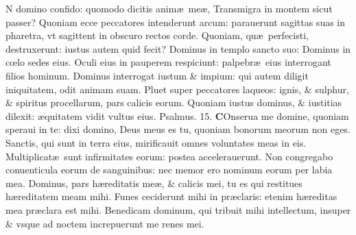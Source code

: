 \documentclass[a5paper,10pt]{book}
\def\ae{æ}
\def\oe{œ}
\begin{document}
\begin{multicols*}{2}
N domino confido: quomodo dicitis anim\ae \ me\ae ,
\newline \color{red} T\color{black}ransmigra in montem sicut passer?
\newline \color{red} Q\color{black}uoniam ecce peccatores intenderunt arcum: parauerunt sagittas suas in pharetra, vt sagittent in obscuro rectos corde.
\newline \color{red} Q\color{black}uoniam, qu\ae \ perfecisti, destruxerunt: iustus autem quid fecit?
\newline \color{red} D\color{black}ominus in templo sancto suo: Dominus in c\oe lo sedes eius.
\newline \color{red} O\color{black}culi eius in pauperem respiciunt: palpebr\ae \ eius interrogant filios hominum.
\newline \color{red} D\color{black}ominus interrogat iustum \& impium: qui autem diligit iniquitatem, odit animam suam.
\newline \color{red} P\color{black}luet super peccatores laqueos: ignis, \& sulphur, \& spiritus procellarum, pars calicis eorum.
\newline \color{red} Q\color{black}uoniam iustus dominus, \& iustitias dilexit: \ae quitatem vidit vultus eius.
\newline \color{red} Psalmus. \hypertarget{ps15}{15.} \color{black}
\lettrine[lines=2]{\bfseries \color{red} C}{}Onserua me domine, quoniam speraui in te: dixi domino, Deus meus es tu, quoniam bonorum meorum non eges.
\newline \color{red} S\color{black}anctis, qui sunt in terra eius, mirificauit omnes voluntates meas in eis.
\newline \color{red} M\color{black}ultiplicat\ae \ sunt infirmitates eorum: postea accelerauerunt.
\newline \color{red} N\color{black}on congregabo conuenticula eorum de sanguinibus: nec memor ero nominum eorum per labia mea.
\newline \color{red} D\color{black}ominus, pars h\ae reditatis me\ae , \& calicis mei, tu es qui restitues h\ae reditatem meam mihi.
\newline \color{red} F\color{black}unes ceciderunt mihi in pr\ae claris: etenim h\ae reditas mea pr\ae clara est mihi.
\newline \color{red} B\color{black}enedicam dominum, qui tribuit mihi intellectum, insuper \& vsque ad noctem increpuerunt me renes mei.

\end{multicols*}
\end{document}

